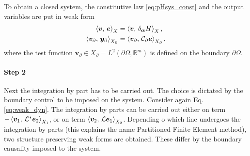 To obtain a closed system, the constitutive law \eqref{eq:pHsys_const} and the output variables are put in weak form
\begin{align}
\inner[X]{\bm{v}}{\bm{e}}&= \inner[X]{\bm{v}}{\delta_{\bm{\alpha}} H}, \\
\inner[X_\partial]{\bm{v}_\partial}{\bm{y}_\partial} &= \inner[X_\partial]{\bm{v}_\partial}{\mathcal{C}_\partial \bm{e}},
\end{align}
where the test function $\bm{v}_\partial \in X_\partial = L^2(\partial \Omega, \mathbb{R}^m)$ is defined on the boundary $\partial\Omega$.


\paragraph{Step 2} Next the integration by part has to be carried out. The choice is dictated by the boundary control to be imposed on the system. Consider again Eq. \eqref{eq:weak_dyn}. The integration by parts can be carried out either on term $-\inner[X_1]{\bm{v}_1}{\mathcal{L}^*\bm{e}_2}$, or on term $\inner[X_2]{\bm{v}_2}{\mathcal{L}\bm{e}_1}$. Depending o which line undergoes the integration by parts (this explains the name Partitioned Finite Element method), two structure preserving weak forms are obtained. These differ by the boundary causality imposed to the system. 


